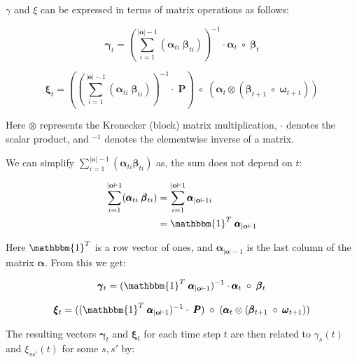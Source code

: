 $\gamma$ and $\xi$ can be expressed in terms of matrix operations as follows:

\begin{equation}
\pmb{\gamma}
    _t = (\sum_{i=1}^{|\mathbf{o}|-1} (\pmb{\alpha}_{t i} \;\pmb{\beta}_{t i}))^{-1} \cdot \pmb{\alpha}_t \; \circ \; \pmb{\beta}_t
    \label{eq:gamma-matrix}
\end{equation}

\begin{equation}
\pmb{\xi}
    _t = ((\sum_{i=1}^{|\mathbf{o}|-1} (\pmb{\alpha}_{t i} \; \pmb{\beta}_{t i}))^{-1} \cdot \; \pmb{P}) \; \circ \;(\pmb{\alpha}_t \otimes (\pmb{\beta}_{t+1} \; \circ \; \pmb{\omega}_{t+1}))
    \label{eq:xi-matrix}
\end{equation}

Here $\otimes$ represents the Kronecker (block) matrix multiplication, $\cdot$ denotes the scalar product, and $^{-1}$ denotes the elementwise inverse of a matrix.

We can simplify $\sum_{i=1}^{|\mathbf{o}|-1} (\pmb{\alpha}_{t i} \pmb{\beta}_{t i})$ as, the sum does not depend on $t$:

\begin{align}
    \sum_{i=1}^{|\mathbf{o}|-1} (\pmb{\alpha}_{t i} \; \pmb{\beta}_{t i}) &= \sum_{i=1}^{|\mathbf{o}|-1} \pmb{\alpha}_{|\mathbf{o}|-1 i} \\
    &= \mathbbm{1}^T \; \pmb{\alpha}_{|\mathbf{o}|-1}
\end{align}

Here $\mathbbm{1}^T$ is a row vector of ones, and $\pmb{\alpha}_{|\mathbf{o}|-1}$ is the last column of the matrix $\pmb{\alpha}$.
From this we get:

\begin{equation}
\pmb{\gamma}
    _t = (\mathbbm{1}^T \; \pmb{\alpha}_{|\mathbf{o}|-1})^{-1} \cdot \pmb{\alpha}_t \; \circ \; \pmb{\beta}_t
    \label{eq:gamma-matrix-ones}
\end{equation}

\begin{equation}
\pmb{\xi}
    _t = ((\mathbbm{1}^T \; \pmb{\alpha}_{|\mathbf{o}|-1})^{-1} \cdot \; \pmb{P}) \; \circ \;(\pmb{\alpha}_t \otimes (\pmb{\beta}_{t+1} \; \circ \; \pmb{\omega}_{t+1}))
    \label{eq:xi-matrix-ones}
\end{equation}

The resulting vectors $\pmb{\gamma}_t$ and $\pmb{\xi}_t$ for each time step $t$ are then related to $\gamma_s(t)$ and $\xi_{ss'}(t)$ for some $s, s'$ by:

